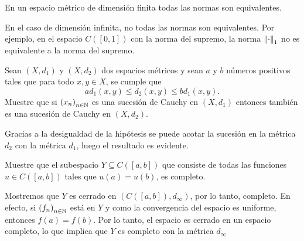 \documentclass[compacto]{aleph-formato}
\begin{document}
\encabezado

\begin{teo}
    En un espacio métrico de dimensión finita todas las normas son equivalentes.
\end{teo}

\begin{obs}
    En el caso de dimensión infinita, no todas las normas son equivalentes. Por ejemplo, en el espacio $C([0,1])$ con la norma del supremo, la norma $\norma{}_1$ no es equivalente a la norma del supremo.
\end{obs}

\begin{ejer}
    Sean $(X,d_1)$ y $(X,d_2)$ dos espacios métricos y sean $a$ y $b$ números positivos tales que para todo $x,y\in X$, se cumple que
    \[
        a d_1(x,y) \leq d_2(x,y) \leq b d_1(x,y).
    \]
    Muestre que si $\left(x_n\right)_{n\in\mathbb{\mathbb{N}}}$ es una sucesión de Cauchy en $(X,d_1)$ entonces también es una sucesión de Cauchy en $(X,d_2)$.
\end{ejer}

\begin{esquema}
Gracias a la desigualdad de la hipótesis se puede acotar la sucesión en la métrica $d_2$ con la métrica $d_1$, luego el resultado es evidente. 
\end{esquema}

\begin{ejer}
    Muestre que el subespacio $Y\subseteq C([a,b])$ que consiste de todas las funciones $u\in C([a,b])$ tales que $u(a)=u(b)$, es completo. 
\end{ejer}

\begin{esquema}
    Mostremos que $Y$ es cerrado en $(C([a,b]),d_\infty)$, por lo tanto, completo. En efecto, si $\left(f_n\right)_{n\in\mathbb{\mathbb{N}}}$ está en $Y$ y como la convergencia del espacio es uniforme, entonces $f(a)=f(b)$. Por lo tanto, el espacio es cerrado en un espacio completo, lo que implica que $Y$ es completo con la métrica $d_\infty$
\end{esquema}
\end{document}
